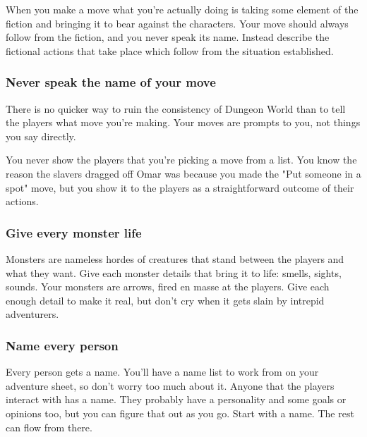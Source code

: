 When you make a move what you're actually doing is taking some element of the fiction and bringing it to bear against the characters. Your move should always follow from the fiction, and you never speak its name. Instead describe the fictional actions that take place which follow from the situation established.

       
\subsubsection{Never speak the name of your move}    
       

There is no quicker way to ruin the consistency of Dungeon World than to tell the players what move you're making. Your moves are prompts to you, not things you say directly.

       

You never show the players that you're picking a move from a list. You know the reason the slavers dragged off Omar was because you made the "Put someone in a spot" move, but you show it to the players as a straightforward outcome of their actions.

       
\subsubsection{Give every monster life}     
       

Monsters are nameless hordes of creatures that stand between the players and what they want. Give each monster details that bring it to life: smells, sights, sounds. Your monsters are arrows, fired en masse at the players. Give each enough detail to make it real, but don't cry when it gets slain by intrepid adventurers.

       
\subsubsection{Name every person}   
       

Every person gets a name. You'll have a name list to work from on your adventure sheet, so don't worry too much about it. Anyone that the players interact with has a name. They probably have a personality and some goals or opinions too, but you can figure that out as you go. Start with a name. The rest can flow from there.

